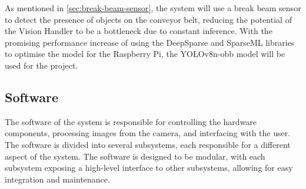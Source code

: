 As mentioned in \autoref{sec:break-beam-sensor}, the system will use a break beam sensor to detect the presence of objects on the conveyor belt, reducing the potential of the Vision Handler to be a bottleneck due to constant inference. With the promising performance increase of using the DeepSparse \cite{deepsparse} and SparseML \cite{sparseml} libraries to optimise the model for the Raspberry Pi, the YOLOv8n-obb model will be used for the project.





\subsection{Software}
\label{sec:electronics-and-software-integration}
The software of the system is responsible for controlling the hardware components, processing images from the camera, and interfacing with the user. The software is divided into several subsystems, each responsible for a different aspect of the system. The software is designed to be modular, with each subsystem exposing a high-level interface to other subsystems, allowing for easy integration and maintenance.

